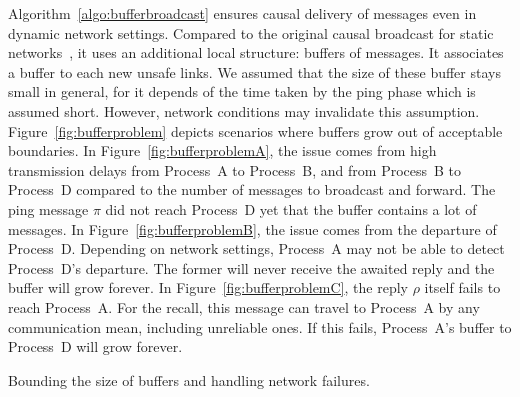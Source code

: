 Algorithm~\ref{algo:bufferbroadcast} ensures causal delivery of messages even in
dynamic network settings. Compared to the original causal broadcast for static
networks~\cite{friedman2004causal}, it uses an additional local structure:
buffers of messages. It associates a buffer to each new unsafe links. We assumed
that the size of these buffer stays small in general, for it depends of the time
taken by the ping phase which is assumed short. However, network conditions may
invalidate this assumption. Figure~\ref{fig:bufferproblem} depicts scenarios
where buffers grow out of acceptable boundaries. In
Figure~\ref{fig:bufferproblemA}, the issue comes from high transmission delays
from Process~A to Process~B, and from Process~B to Process~D compared to the
number of messages to broadcast and forward. The ping message $\pi$ did not
reach Process~D yet that the buffer contains a lot of messages. In
Figure~\ref{fig:bufferproblemB}, the issue comes from the departure of
Process~D. Depending on network settings, Process~A may not be able to detect
Process~D's departure. The former will never receive the awaited reply and the
buffer will grow forever. In Figure~\ref{fig:bufferproblemC}, the reply $\rho$
itself fails to reach Process~A. For the recall, this message can travel to
Process~A by any communication mean, including unreliable ones. If this fails,
Process~A's buffer to Process~D will grow
forever. %

\begin{algorithm}
  
  \caption{\label{algo:boundingbuffer}Bounding the size of buffers and handling
    network failures.}
\end{algorithm}

